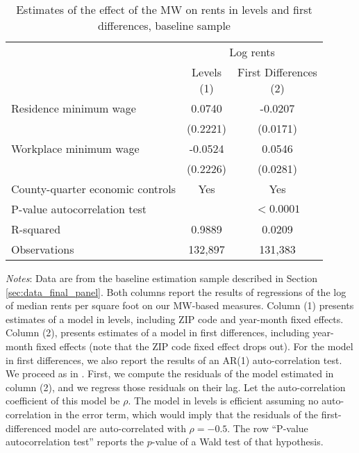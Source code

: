 \begin{table}[hbt!] \centering
    \caption{Estimates of the effect of the MW on rents in levels and first differences,
             baseline sample}
    \label{tab:autocorrelation}
    \begin{tabular}{@{}lcc@{}}
        \toprule
            & \multicolumn{2}{c}{Log rents}                             \\ \cmidrule(l){2-3} 
            & \shortstack{Levels\\(1)} 
            & \shortstack{First Differences\\(2)}                       \\ \midrule
        Residence minimum wage             &  0.0740   &  -0.0207              \\
                                           & (0.2221)  & (0.0171)             \\
        Workplace minimum wage             &  -0.0524   &  0.0546              \\
                                           & (0.2226)  & (0.0281)             \\ \midrule
        County-quarter economic controls   &  Yes   &  Yes              \\
        P-value autocorrelation test       &        &  $<0.0001$        \\
        R-squared                          &  0.9889   &  0.0209              \\
        Observations                       &  132,897  &  131,383             \\ \bottomrule
    \end{tabular}

    \begin{minipage}{.95\textwidth} \footnotesize
        \vspace{2mm}
        \textit{Notes}: 
        Data are from the baseline estimation sample described in Section 
        \ref{sec:data_final_panel}.
        Both columns report the results of regressions of the log of 
        median rents per square foot on our MW-based measures.
        Column (1) presents estimates of a model in levels, including 
        ZIP code and year-month fixed effects.
        Column (2), presents estimates of a model in first differences, 
        including year-month fixed effects 
        (note that the ZIP code fixed effect drops out).
        For the model in first differences, we also report the results of an 
        AR(1) auto-correlation test.
        We proceed as in \parencite[][Section 10.6.3]{wooldridge2010}.
        First, we compute the residuals of the model estimated in column (2), 
        and we regress those residuals on their lag.
        Let the auto-correlation coefficient of this model be $\rho$.
        The model in levels is efficient assuming no auto-correlation in the 
        error term, which would imply that the residuals of the 
        first-differenced model are auto-correlated with $\rho = -0.5$.
        The row ``P-value autocorrelation test'' reports the $p$-value of 
        a Wald test of that hypothesis.
    \end{minipage}
\end{table}
